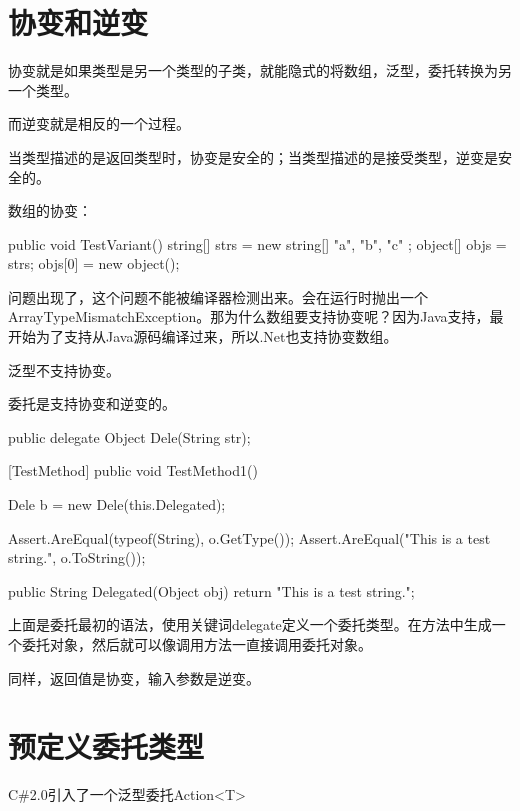 \section{协变和逆变}

协变就是如果类型是另一个类型的子类，就能隐式的将数组，泛型，委托转换为另一个类型。

而逆变就是相反的一个过程。

当类型描述的是返回类型时，协变是安全的；当类型描述的是接受类型，逆变是安全的。

数组的协变：

\begin{CSharp}
        public void TestVariant()
        {
            string[] strs = new string[] { "a", "b", "c" };
            object[] objs = strs;
            objs[0] = new object();
        }
\end{CSharp}

问题出现了，这个问题不能被编译器检测出来。会在运行时抛出一个ArrayTypeMismatchException。那为什么数组要支持协变呢？因为Java支持，最开始为了支持从Java源码编译过来，所以.Net也支持协变数组。

泛型不支持协变。

委托是支持协变和逆变的。

\begin{CSharp}[协变和逆变]
        
        public delegate Object Dele(String str);

        [TestMethod]
        public void TestMethod1()
        {
            Dele b = new Dele(this.Delegated);

            Assert.AreEqual(typeof(String), o.GetType());
            Assert.AreEqual("This is a test string.", o.ToString());            
        }

        public String Delegated(Object obj) { return "This is a test string.";}
\end{CSharp}

上面是委托最初的语法，使用关键词delegate定义一个委托类型。在方法中生成一个委托对象，然后就可以像调用方法一直接调用委托对象。

同样，返回值是协变，输入参数是逆变。


\section{预定义委托类型}

C\#2.0引入了一个泛型委托Action<T>

